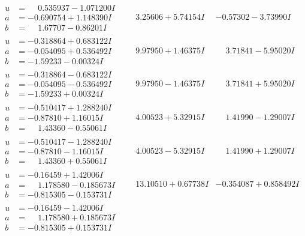 \documentclass[1p]{elsarticle_modified}
\theoremstyle{definition}
\begin{document}
$$\begin{array}{c|c|c}
\begin{aligned}
u &= \phantom{-}0.535937 - 1.071200 I \\
a &= -0.690754 + 1.148390 I \\
b &= \phantom{-}1.67707 - 0.86201 I\end{aligned}
 & \phantom{-}3.25606 + 5.74154 I & -0.57302 - 3.73990 I \\ \hline\begin{aligned}
u &= -0.318864 + 0.683122 I \\
a &= -0.054095 + 0.536492 I \\
b &= -1.59233 - 0.00324 I\end{aligned}
 & \phantom{-}9.97950 + 1.46375 I & \phantom{-}3.71841 - 5.95020 I \\ \hline\begin{aligned}
u &= -0.318864 - 0.683122 I \\
a &= -0.054095 - 0.536492 I \\
b &= -1.59233 + 0.00324 I\end{aligned}
 & \phantom{-}9.97950 - 1.46375 I & \phantom{-}3.71841 + 5.95020 I \\ \hline\begin{aligned}
u &= -0.510417 + 1.288240 I \\
a &= -0.87810 + 1.16015 I \\
b &= \phantom{-}1.43360 - 0.55061 I\end{aligned}
 & \phantom{-}4.00523 + 5.32915 I & \phantom{-}1.41990 - 1.29007 I \\ \hline\begin{aligned}
u &= -0.510417 - 1.288240 I \\
a &= -0.87810 - 1.16015 I \\
b &= \phantom{-}1.43360 + 0.55061 I\end{aligned}
 & \phantom{-}4.00523 - 5.32915 I & \phantom{-}1.41990 + 1.29007 I \\ \hline\begin{aligned}
u &= -0.16459 + 1.42006 I \\
a &= \phantom{-}1.178580 - 0.185673 I \\
b &= -0.815305 - 0.153731 I\end{aligned}
 & \phantom{-}13.10510 + 0.67738 I & -0.354087 + 0.858492 I \\ \hline\begin{aligned}
u &= -0.16459 - 1.42006 I \\
a &= \phantom{-}1.178580 + 0.185673 I \\
b &= -0.815305 + 0.153731 I\end{aligned}

\end{array}$$
\end{document}
